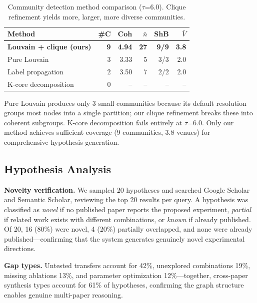 \documentclass[conference]{IEEEtran}
\begin{document}
\begin{table}[t]
\caption{Community detection method comparison ($\tau$=6.0). Clique refinement yields more, larger, more diverse communities.}
\label{tab:community_methods}
\centering
\footnotesize
\setlength{\tabcolsep}{3pt}
\begin{tabular}{l|rrrrr}
\toprule
\textbf{Method} & \textbf{\#C} & \textbf{Coh} & \textbf{$\bar{n}$} & \textbf{ShB} & \textbf{$\bar{V}$} \\
\midrule
\textbf{Louvain + clique (ours)} & \textbf{9} & \textbf{4.94} & \textbf{27} & \textbf{9/9} & \textbf{3.8} \\
Pure Louvain & 3 & 3.33 & 5 & 3/3 & 2.0 \\
Label propagation~\cite{raghavan2007labelprop} & 2 & 3.50 & 7 & 2/2 & 2.0 \\
K-core decomposition~\cite{seidman1983kcore} & 0 & -- & -- & -- & -- \\
\bottomrule
\end{tabular}
\end{table}

Pure Louvain produces only 3 small communities because its default resolution groups most nodes into a single partition; our clique refinement breaks these into coherent subgroups.
K-core decomposition fails entirely at $\tau$=6.0.
Only our method achieves sufficient coverage (9 communities, 3.8 venues) for comprehensive hypothesis generation.


\subsection{Hypothesis Analysis}

\textbf{Novelty verification.}
We sampled 20 hypotheses and searched Google Scholar and Semantic Scholar, reviewing the top 20 results per query.
A hypothesis was classified as \emph{novel} if no published paper reports the proposed experiment, \emph{partial} if related work exists with different combinations, or \emph{known} if already published.
Of 20, 16 (80\%) were novel, 4 (20\%) partially overlapped, and none were already published---confirming that the system generates genuinely novel experimental directions.

\textbf{Gap types.}
Untested transfers account for 42\%, unexplored combinations 19\%, missing ablations 13\%, and parameter optimization 12\%---together, cross-paper synthesis types account for 61\% of hypotheses, confirming the graph structure enables genuine multi-paper reasoning.
\end{document}
